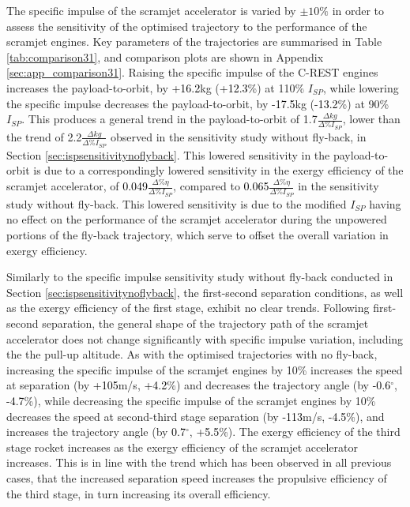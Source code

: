 The specific impulse of the scramjet accelerator is varied by $\pm10\%$ in order to assess the sensitivity of the optimised trajectory to the performance of the scramjet engines. 
Key parameters of the trajectories are summarised in Table \ref{tab:comparison31}, and comparison plots are shown in Appendix \ref{sec:app_comparison31}.
Raising the specific impulse of the C-REST engines increases the payload-to-orbit, by \textcolor{black}{+16.2}kg (\textcolor{black}{+12.3}\%) at 110\% $I_{SP}$, while lowering the specific impulse decreases the payload-to-orbit, by \textcolor{black}{-17.5}kg (\textcolor{black}{-13.2}\%) at 90\% $I_{SP}$. 
This produces a general trend in the payload-to-orbit of 1.7$\frac{\Delta kg}{\Delta \%I_{SP} }$, lower than the trend of 2.2$\frac{\Delta kg}{\Delta \%I_{SP} }$ observed in the sensitivity study without fly-back, in Section \ref{sec:ispsensitivitynoflyback}. 
This lowered sensitivity in the payload-to-orbit is due to a correspondingly lowered sensitivity in the exergy efficiency of the scramjet accelerator, of \textcolor{black}{0.049}$\frac{\Delta \% \eta}{\Delta \%I_{SP} }$, compared to \textcolor{black}{0.065}$\frac{\Delta \% \eta}{\Delta \%I_{SP} }$ in the sensitivity study without fly-back. This lowered sensitivity is due to the modified $I_{SP}$ having no effect on the performance of the scramjet accelerator during the unpowered portions of the fly-back trajectory, which serve to offset the overall variation in exergy efficiency. 


Similarly to the specific impulse sensitivity study without fly-back conducted in Section \ref{sec:ispsensitivitynoflyback}, the first-second separation conditions, as well as the exergy efficiency of the first stage, exhibit no clear trends. Following first-second separation, the general shape of the trajectory path of the scramjet accelerator does not change significantly with specific impulse variation, including the the pull-up altitude. As with the optimised trajectories with no fly-back, increasing the specific impulse of the scramjet engines by 10\% increases the speed at separation (by \textcolor{black}{+105}m/s, \textcolor{black}{+4.2}\%) and decreases the trajectory angle (by \textcolor{black}{-0.6}$^\circ$, \textcolor{black}{-4.7}\%), while decreasing the specific impulse of the scramjet engines by 10\% decreases the speed at second-third stage separation (by \textcolor{black}{-113}m/s, \textcolor{black}{-4.5}\%), and increases the trajectory angle (by \textcolor{black}{0.7}$^\circ$, \textcolor{black}{+5.5}\%).
The exergy efficiency of the third stage rocket increases as the exergy efficiency of the scramjet accelerator increases. This is in line with the trend which has been observed in all previous cases, that the increased separation speed increases the propulsive efficiency of the third stage, in turn increasing its overall efficiency. 






